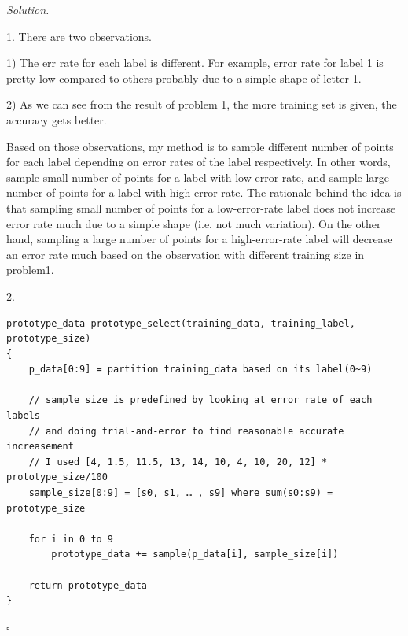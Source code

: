 \documentclass[11pt]{article}
\theoremstyle{definition}
\newenvironment{solution}{\noindent\emph{Solution.}}{\hfill$\square$}
\begin{document}
\begin{solution}

1. There are two observations.

 1) The err rate for each label is different.
For example, error rate for label 1 is pretty low compared to others probably due to a simple shape of letter 1.


 2) As we can see from the result of problem 1, the more training set is given, the accuracy gets better.

Based on those observations, my method is to sample different number of points for each label depending on error rates of the label respectively. In other words, sample small number of points for a label with low error rate, and sample large number of points for a label with high error rate. 
The rationale behind the idea is that sampling small number of points for a low-error-rate label does not increase error rate much due to a simple shape (i.e. not much variation). On the other hand, sampling a large number of points for a high-error-rate label will decrease an error rate much based on the observation with different training size in problem1.

2.
\begin{verbatim}
prototype_data prototype_select(training_data, training_label, prototype_size)
{
    p_data[0:9] = partition training_data based on its label(0~9)
	
    // sample size is predefined by looking at error rate of each labels
    // and doing trial-and-error to find reasonable accurate increasement
    // I used [4, 1.5, 11.5, 13, 14, 10, 4, 10, 20, 12] * prototype_size/100
    sample_size[0:9] = [s0, s1, … , s9] where sum(s0:s9) = prototype_size
	
    for i in 0 to 9
        prototype_data += sample(p_data[i], sample_size[i])
	
    return prototype_data
}
\end{verbatim}


\end{solution}
\end{document}
